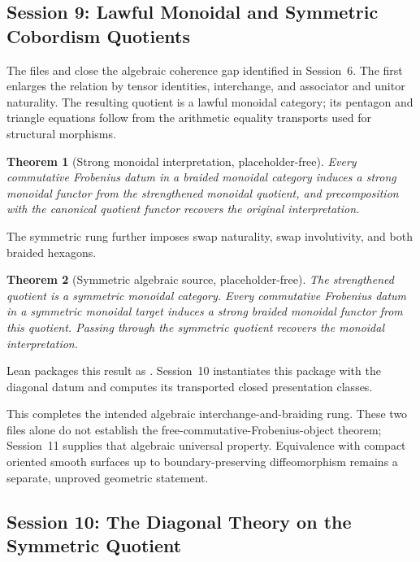 \documentclass[11pt]{amsart}
\theoremstyle{plain}
\newtheorem{theorem}{Theorem}[section]
\theoremstyle{definition}
\begin{document}
\subsection{Session 9: Lawful Monoidal and Symmetric Cobordism Quotients}

The files  and  close the algebraic coherence gap identified in Session~6. The first enlarges the relation by tensor identities, interchange, and associator and unitor naturality. The resulting quotient is a lawful monoidal category; its pentagon and triangle equations follow from the arithmetic equality transports used for structural morphisms.

\begin{theorem}[Strong monoidal interpretation, placeholder-free]
Every commutative Frobenius datum in a braided monoidal category induces a strong monoidal functor from the strengthened monoidal quotient, and precomposition with the canonical quotient functor recovers the original interpretation.
\end{theorem}

The symmetric rung further imposes swap naturality, swap involutivity, and both braided hexagons.

\begin{theorem}[Symmetric algebraic source, placeholder-free]
The strengthened quotient is a symmetric monoidal category. Every commutative Frobenius datum in a symmetric monoidal target induces a strong braided monoidal functor from this quotient. Passing through the symmetric quotient recovers the monoidal interpretation.
\end{theorem}

Lean packages this result as . Session~10 instantiates this package with the diagonal datum and computes its transported closed presentation classes.

This completes the intended algebraic interchange-and-braiding rung. These two files alone do not establish the free-commutative-Frobenius-object theorem; Session~11 supplies that algebraic universal property. Equivalence with compact oriented smooth surfaces up to boundary-preserving diffeomorphism remains a separate, unproved geometric statement.

\subsection{Session 10: The Diagonal Theory on the Symmetric Quotient}
\end{document}
